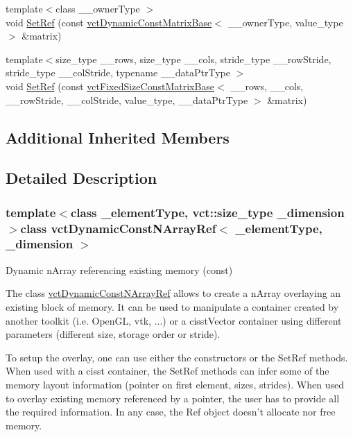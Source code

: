 \begin{DoxyCompactItemize}
\item 
{\footnotesize template$<$class \-\_\-\-\_\-owner\-Type $>$ }\\void \hyperlink{classvct_dynamic_const_n_array_ref_a563ed48cec7d06b19455ef3806996c59}{Set\-Ref} (const \hyperlink{classvct_dynamic_const_matrix_base}{vct\-Dynamic\-Const\-Matrix\-Base}$<$ \-\_\-\-\_\-owner\-Type, value\-\_\-type $>$ \&matrix)
\item 
{\footnotesize template$<$size\-\_\-type \-\_\-\-\_\-rows, size\-\_\-type \-\_\-\-\_\-cols, stride\-\_\-type \-\_\-\-\_\-row\-Stride, stride\-\_\-type \-\_\-\-\_\-col\-Stride, typename \-\_\-\-\_\-data\-Ptr\-Type $>$ }\\void \hyperlink{classvct_dynamic_const_n_array_ref_a81f94505fe95d71453fde0a53f12b7aa}{Set\-Ref} (const \hyperlink{classvct_fixed_size_const_matrix_base}{vct\-Fixed\-Size\-Const\-Matrix\-Base}$<$ \-\_\-\-\_\-rows, \-\_\-\-\_\-cols, \-\_\-\-\_\-row\-Stride, \-\_\-\-\_\-col\-Stride, value\-\_\-type, \-\_\-\-\_\-data\-Ptr\-Type $>$ \&matrix)
\end{DoxyCompactItemize}
\subsection*{Additional Inherited Members}


\subsection{Detailed Description}
\subsubsection*{template$<$class \-\_\-element\-Type, vct\-::size\-\_\-type \-\_\-dimension$>$class vct\-Dynamic\-Const\-N\-Array\-Ref$<$ \-\_\-element\-Type, \-\_\-dimension $>$}

Dynamic n\-Array referencing existing memory (const) 

The class \hyperlink{classvct_dynamic_const_n_array_ref}{vct\-Dynamic\-Const\-N\-Array\-Ref} allows to create a n\-Array overlaying an existing block of memory. It can be used to manipulate a container created by another toolkit (i.\-e. Open\-G\-L, vtk, ...) or a cisst\-Vector container using different parameters (different size, storage order or stride).

To setup the overlay, one can use either the constructors or the Set\-Ref methods. When used with a cisst container, the Set\-Ref methods can infer some of the memory layout information (pointer on first element, sizes, strides). When used to overlay existing memory referenced by a pointer, the user has to provide all the required information. In any case, the Ref object doesn't allocate nor free memory.

